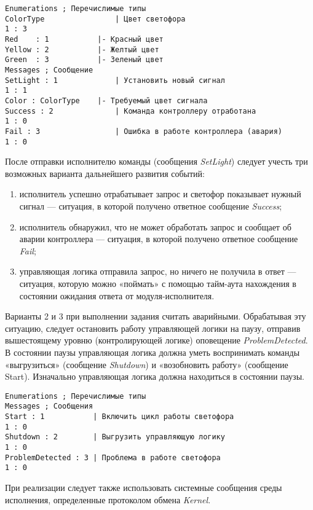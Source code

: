	\begin{lstlisting}
Enumerations ; Перечислимые типы
ColorType                | Цвет светофора
1 : 3
Red    : 1           |- Красный цвет 
Yellow : 2           |- Желтый цвет
Green  : 3           |- Зеленый цвет
Messages ; Сообщение
SetLight : 1             | Установить новый сигнал
1 : 1
Color : ColorType    |- Требуемый цвет сигнала
Success : 2              | Команда контроллеру отработана
1 : 0
Fail : 3                 | Ошибка в работе контроллера (авария)
1 : 0 
	\end{lstlisting}
	
	После отправки исполнителю команды (сообщения \textit{SetLight}) следует учесть три возможных варианта дальнейшего развития событий:
	\begin{enumerate}
		\item 	исполнитель успешно отрабатывает запрос и светофор показывает нужный сигнал — ситуация, в которой получено ответное сообщение \textit{Success};
		\item исполнитель обнаружил, что не может обработать запрос и сообщает об аварии контроллера — ситуация, в которой получено ответное сообщение \textit{Fail};
		\item управляющая логика отправила запрос, но ничего не получила в ответ — ситуация, которую можно «поймать» с помощью тайм-аута нахождения в состоянии ожидания ответа от модуля-исполнителя.
	\end{enumerate}
	
	Варианты 2 и 3 при выполнении задания считать аварийными. Обрабатывая эту ситуацию, следует остановить работу управляющей логики на паузу, отправив вышестоящему уровню (контролирующей логике) оповещение \textit{ProblemDetected}. В состоянии паузы управляющая логика должна уметь воспринимать команды «выгрузиться» (сообщение \textit{Shutdown}) и «возобновить работу» (сообщение Start). Изначально управляющая логика должна находиться в состоянии паузы.
	\begin{lstlisting}
Enumerations ; Перечислимые типы
Messages ; Сообщения
Start : 1           | Включить цикл работы светофора
1 : 0
Shutdown : 2        | Выгрузить управляющую логику
1 : 0
ProblemDetected : 3 | Проблема в работе светофора
1 : 0
	\end{lstlisting}
	
При реализации следует также использовать системные сообщения среды исполнения, определенные протоколом обмена \textit{Kernel}.

